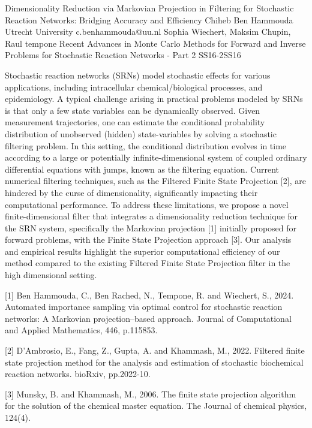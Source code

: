 	\begin{talk}
		{Dimensionality Reduction via Markovian Projection in Filtering for Stochastic Reaction Networks:  Bridging Accuracy and Efficiency}%
		{Chiheb Ben Hammouda}%
		{Utrecht University}%
		{c.benhammouda@uu.nl}%
		{Sophia Wiechert, Maksim Chupin, Raul tempone}%
{Recent Advances in Monte Carlo Methods for Forward and Inverse Problems for Stochastic Reaction Networks - Part 2}
{}{SS16-2}{SS16}

		
		
		
		
	Stochastic reaction networks (SRNs)  model  stochastic effects for  various applications, including intracellular chemical/biological processes, and  epidemiology. A typical challenge arising in practical problems modeled by SRNs is that only a few state variables can be dynamically observed. Given measurement trajectories, one can estimate the conditional probability distribution of unobserved (hidden) state-variables  by solving a stochastic filtering problem. In this setting, the conditional distribution evolves in time according to a large or potentially infinite-dimensional system of coupled ordinary differential equations with jumps, known as the filtering equation. Current numerical filtering techniques, such as the Filtered Finite State Projection [2], are hindered by the curse of dimensionality, significantly impacting their computational performance. To address these limitations, we propose a novel finite-dimensional filter that  integrates a dimensionality reduction technique for the SRN system, specifically the Markovian projection [1] initially proposed for forward problems, with the Finite State Projection approach [3]. Our analysis and empirical results highlight  the superior  computational efficiency of our method compared to the existing Filtered Finite State Projection filter in the high dimensional setting.

		
		\medskip
		
		[1] Ben Hammouda, C., Ben Rached, N., Tempone, R. and Wiechert, S., 2024. Automated importance sampling via optimal control for stochastic reaction networks: A Markovian projection–based approach. Journal of Computational and Applied Mathematics, 446, p.115853.
		
	[2]  D’Ambrosio, E., Fang, Z., Gupta, A. and Khammash, M., 2022. Filtered finite state projection method for the analysis and estimation of stochastic biochemical reaction networks. bioRxiv, pp.2022-10.
	
	[3] Munsky, B. and Khammash, M., 2006. The finite state projection algorithm for the solution of the chemical master equation. The Journal of chemical physics, 124(4).
	\end{talk}

